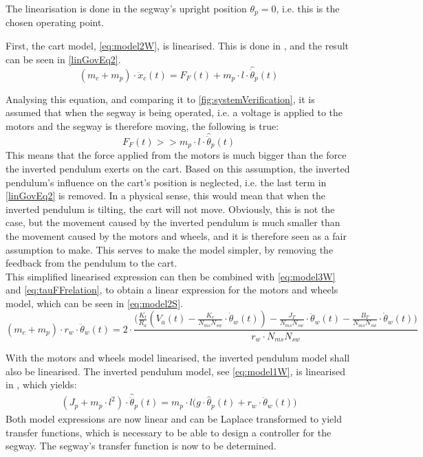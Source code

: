 The linearisation is done in the segway's upright position $\theta_p = 0$, i.e. this is the chosen operating point.

First, the cart model, \autoref{eq:model2W}, is linearised. This is done in , and the result can be seen in \autoref{linGovEq2}.
\begin{equation}
(m_c + m_p) \cdot \ddot x_c(t) = F_{F}(t) + m_p \cdot l \cdot \hat{\ddot{\theta}}_p(t)\label{linGovEq2}
\end{equation}

Analysing this equation, and comparing it to \autoref{fig:systemVerification}, it is assumed that when the segway is being operated, i.e. a voltage is applied to the motors and the segway is therefore moving, the following is true:
$$ F_F(t) >> m_p \cdot l \cdot \hat{\ddot{\theta}}_p(t) $$
This means that the force applied from the motors is much bigger than the force the inverted pendulum exerts on the cart. Based on this assumption, the inverted pendulum's influence on the cart's position is neglected, i.e. the last term in \autoref{linGovEq2} is removed. In a physical sense, this would mean that when the inverted pendulum is tilting, the cart will not move. Obviously, this is not the case, but the movement caused by the inverted pendulum is much smaller than the movement caused by the motors and wheels, and it is therefore seen as a fair assumption to make. This serves to make the model simpler, by removing the feedback from the pendulum to the cart.\\
This simplified linearised expression can then be combined with \autoref{eq:model3W} and \autoref{eq:tauFFrelation}, to obtain a linear expression for the motors and wheels model, which can be seen in \autoref{eq:model2S}.
\begin{equation}
(m_c + m_p) \cdot r_w \cdot \ddot \theta_w(t) = 2 \cdot \frac{\Big(\frac{K_t}{R_a} \left( V_a(t) - \frac{K_e}{N_{ms} N_{sw}} \cdot \dot\theta_w(t) \right) - \frac{J_{T}}{N_{ms} N_{sw}} \cdot \ddot\theta_w(t) - \frac{B_{T}}{N_{ms} N_{sw}} \cdot \dot\theta_w(t) \Big)}{r_w \cdot N_{ms} N_{sw}} \label{eq:model2S}
\end{equation} 

With the motors and wheels model linearised, the inverted pendulum model shall also be linearised. The inverted pendulum model, see \autoref{eq:model1W}, is linearised in , which yields:
\begin{align}
(J_p+m_p\cdot l^2)\cdot \hat{\ddot \theta}_p(t) = m_p \cdot l \Big(g \cdot \hat{\theta}_p(t) + r_w \cdot \ddot \theta_w(t)   
\Big)\label{eq:firstModelLin}
\end{align}
Both model expressions are now linear and can be Laplace transformed to yield transfer functions, which is necessary to be able to design a controller for the segway. The segway's transfer function is now to be determined.



